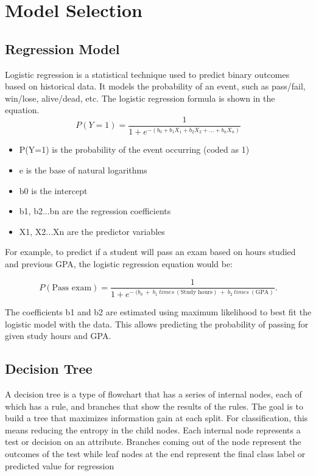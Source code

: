 \documentclass[12pt, a4paper, twoside]{report}
\theoremstyle{plain} %
\theoremstyle{definition} %
\theoremstyle{remark} %
\numberwithin{equation}{chapter}
\begin{document}
\section{Model Selection}

    
\subsection{Regression Model}
Logistic regression is a statistical technique used to predict binary outcomes based on historical data. It models the probability of an event, such as pass/fail, win/lose, alive/dead, etc.
The logistic regression formula is shown in the equation.
\begin{equation}
P(Y=1) = \frac{1}{1+e^{-(b_0 + b_1X_1 + b_2X_2 + ... + b_nX_n)}}
\end{equation}
\begin{itemize}
    \item P(Y=1) is the probability of the event occurring (coded as 1)
    \item e is the base of natural logarithms
    \item b0 is the intercept
    \item b1, b2...bn are the regression coefficients
    \item X1, X2...Xn are the predictor variables
\end{itemize}
For example, to predict if a student will pass an exam based on hours studied and previous GPA, the logistic regression equation would be:

\begin{equation}
P(\text{Pass exam}) = \frac{1}{1 + e^{-\ (b_0\ +\ b_1 \ times \ (\text{Study hours})\ +\ b_2  \ times \ (\text{GPA})}}.
\end{equation}

The coefficients b1 and b2 are estimated using maximum likelihood to best fit the logistic model with the data. This allows predicting the probability of passing for given study hours and GPA.

\subsection{Decision Tree}
A decision tree is a type of flowchart that has a series of internal nodes, each of which has a rule, and branches that show the results of the rules. The goal is to build a tree that maximizes information gain at each split. For classification, this means reducing the entropy in the child nodes.
Each internal node represents a test or decision on an attribute. Branches coming out of the node represent the outcomes of the test while leaf nodes at the end represent the final class label or predicted value for regression
\end{document}
